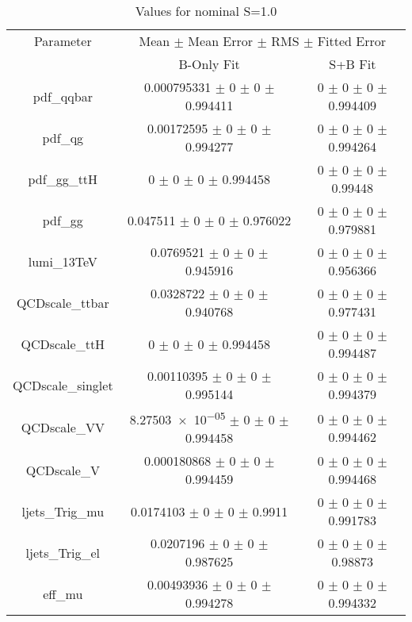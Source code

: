 \begin{table}
\centering
\caption{Values for nominal S=1.0}
\begin{tabular}{ccc}
\toprule
Parameter 	& \multicolumn{2}{c}{Mean $\pm$ Mean Error $\pm$ RMS $\pm$ Fitted Error}\\
 	& B-Only Fit & S+B Fit\\
\midrule
pdf\_qqbar 	& \num{0.000795331} $\pm$ \num{0} $\pm$ \num{0} $\pm$ \num{0.994411} 	& \num{0} $\pm$ \num{0} $\pm$ \num{0} $\pm$ \num{0.994409}\\
pdf\_qg 	& \num{0.00172595} $\pm$ \num{0} $\pm$ \num{0} $\pm$ \num{0.994277} 	& \num{0} $\pm$ \num{0} $\pm$ \num{0} $\pm$ \num{0.994264}\\
pdf\_gg\_ttH 	& \num{0} $\pm$ \num{0} $\pm$ \num{0} $\pm$ \num{0.994458} 	& \num{0} $\pm$ \num{0} $\pm$ \num{0} $\pm$ \num{0.99448}\\
pdf\_gg 	& \num{0.047511} $\pm$ \num{0} $\pm$ \num{0} $\pm$ \num{0.976022} 	& \num{0} $\pm$ \num{0} $\pm$ \num{0} $\pm$ \num{0.979881}\\
lumi\_13TeV 	& \num{0.0769521} $\pm$ \num{0} $\pm$ \num{0} $\pm$ \num{0.945916} 	& \num{0} $\pm$ \num{0} $\pm$ \num{0} $\pm$ \num{0.956366}\\
QCDscale\_ttbar 	& \num{0.0328722} $\pm$ \num{0} $\pm$ \num{0} $\pm$ \num{0.940768} 	& \num{0} $\pm$ \num{0} $\pm$ \num{0} $\pm$ \num{0.977431}\\
QCDscale\_ttH 	& \num{0} $\pm$ \num{0} $\pm$ \num{0} $\pm$ \num{0.994458} 	& \num{0} $\pm$ \num{0} $\pm$ \num{0} $\pm$ \num{0.994487}\\
QCDscale\_singlet 	& \num{0.00110395} $\pm$ \num{0} $\pm$ \num{0} $\pm$ \num{0.995144} 	& \num{0} $\pm$ \num{0} $\pm$ \num{0} $\pm$ \num{0.994379}\\
QCDscale\_VV 	& \num{8.27503e-05} $\pm$ \num{0} $\pm$ \num{0} $\pm$ \num{0.994458} 	& \num{0} $\pm$ \num{0} $\pm$ \num{0} $\pm$ \num{0.994462}\\
QCDscale\_V 	& \num{0.000180868} $\pm$ \num{0} $\pm$ \num{0} $\pm$ \num{0.994459} 	& \num{0} $\pm$ \num{0} $\pm$ \num{0} $\pm$ \num{0.994468}\\
ljets\_Trig\_mu 	& \num{0.0174103} $\pm$ \num{0} $\pm$ \num{0} $\pm$ \num{0.9911} 	& \num{0} $\pm$ \num{0} $\pm$ \num{0} $\pm$ \num{0.991783}\\
ljets\_Trig\_el 	& \num{0.0207196} $\pm$ \num{0} $\pm$ \num{0} $\pm$ \num{0.987625} 	& \num{0} $\pm$ \num{0} $\pm$ \num{0} $\pm$ \num{0.98873}\\
eff\_mu 	& \num{0.00493936} $\pm$ \num{0} $\pm$ \num{0} $\pm$ \num{0.994278} 	& \num{0} $\pm$ \num{0} $\pm$ \num{0} $\pm$ \num{0.994332}\\

\end{tabular}
\end{table}
